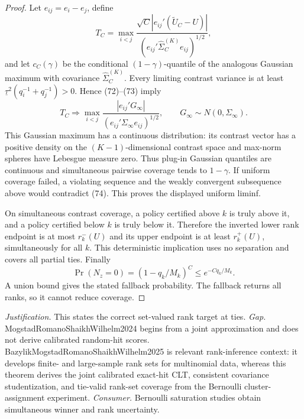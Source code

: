 \documentclass{article}
\begin{document}
\begin{proof}
Let \(e_{ij}=e_i-e_j\), define
\[
T_C=\max_{i<j}\frac{\sqrt C|e_{ij}'(\widetilde U_C-U)|}
{(e_{ij}'\widehat\Sigma_C^{(K)}e_{ij})^{1/2}},
\]
and let \(c_C(\gamma)\) be the conditional \((1-\gamma)\)-quantile of the analogous Gaussian maximum with covariance \(\widehat\Sigma_C^{(K)}\).  Every limiting contrast variance is at least \(\underline\tau^2(q_i^{-1}+q_j^{-1})>0\).  Hence (72)--(73) imply
\[
T_C\Rightarrow\max_{i<j}\frac{|e_{ij}'G_\infty|}
{(e_{ij}'\Sigma_\infty e_{ij})^{1/2}},\qquad G_\infty\sim N(0,\Sigma_\infty). \tag{74}
\]
This Gaussian maximum has a continuous distribution: its contrast vector has a positive density on the \((K-1)\)-dimensional contrast space and max-norm spheres have Lebesgue measure zero.  Thus plug-in Gaussian quantiles are continuous and simultaneous pairwise coverage tends to \(1-\gamma\).  If uniform coverage failed, a violating sequence and the weakly convergent subsequence above would contradict (74).  This proves the displayed uniform liminf.

On simultaneous contrast coverage, a policy certified above \(k\) is truly above it, and a policy certified below \(k\) is truly below it.  Therefore the inverted lower rank endpoint is at most \(r_k^-(U)\) and its upper endpoint is at least \(r_k^+(U)\), simultaneously for all \(k\).  This deterministic implication uses no separation and covers all partial ties.  Finally
\[
\Pr(N_z=0)=(1-q_k/M_k)^C\leq e^{-Cq_k/M_k}.
\]
A union bound gives the stated fallback probability.  The fallback returns all ranks, so it cannot reduce coverage.
\end{proof}
\par\smallskip\noindent \textit{Justification.} This states the correct set-valued rank target at ties. \textit{Gap.} MogstadRomanoShaikhWilhelm2024 begins from a joint approximation and does not derive calibrated random-hit scores.  BazylikMogstadRomanoShaikhWilhelm2025 is relevant rank-inference context: it develops finite- and large-sample rank sets for multinomial data, whereas this theorem derives the joint calibrated exact-hit CLT, consistent covariance studentization, and tie-valid rank-set coverage from the Bernoulli cluster-assignment experiment. \textit{Consumer.} Bernoulli saturation studies obtain simultaneous winner and rank uncertainty.
\end{document}
